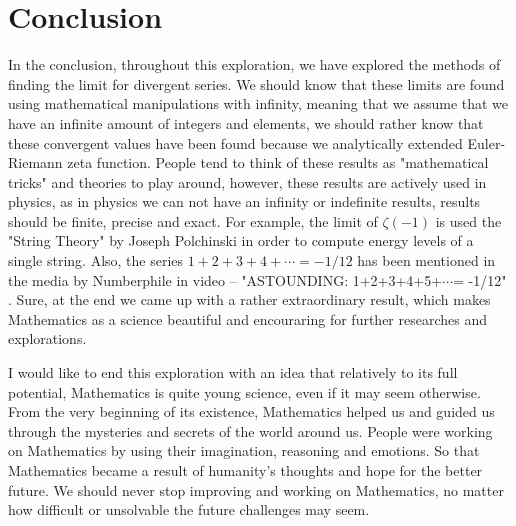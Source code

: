\documentclass[a4paper]{article}
\begin{document}
\section{Conclusion}
\label{sec:org9816d69}

In the conclusion, throughout this exploration, we have explored the methods of
finding the limit for divergent series. We should know that these limits are
found using mathematical manipulations with infinity, meaning that we assume
that we have an infinite amount of integers and elements, we should rather know
that these convergent values have been found because we analytically extended
Euler-Riemann zeta function. People tend to think of these results as
"mathematical tricks" and theories to play around, however, these results are
actively used in physics, as in physics we can not have an infinity or
indefinite results, results should be finite, precise and exact. For example,
the limit of \(\zeta(-1)\) is used the "String Theory" by Joseph Polchinski
\cite{String} in order to compute energy levels of a single string. Also, the
series \(1+2+3+4+\cdots=-1/12\) has been mentioned in the media by Numberphile in
video – "ASTOUNDING: 1+2+3+4+5+\(\cdots{}\)= -1/12" \cite{Numberphile}. Sure, at the end
we came up with a rather extraordinary result, which makes Mathematics as a
science beautiful and encouraring for further researches and explorations.  

I would like to end this exploration with
an idea that relatively to its full potential, Mathematics is quite young
science, even if it may seem otherwise. From the very beginning of its
existence, Mathematics helped us and guided us through the mysteries and secrets
of the world around us. People were working on Mathematics by using their
imagination, reasoning and emotions. So that Mathematics became a result of
humanity's thoughts and hope for the better future. We should never stop
improving and working on Mathematics, no matter how difficult or unsolvable the
future challenges may seem. 



\end{document}
